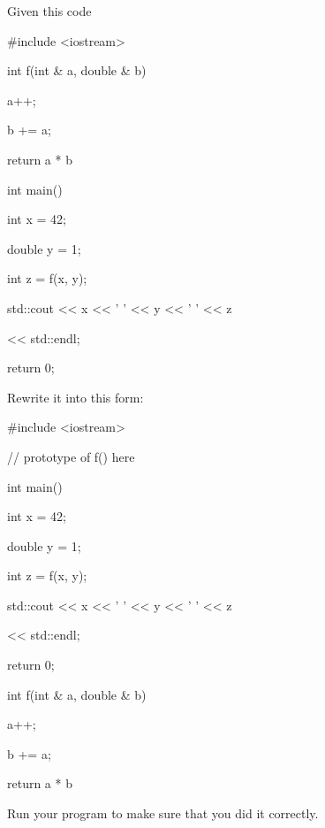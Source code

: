 Given this code



\begin{consolethree}[escapeinside=||]

#include <iostream>



int f(int & a, double & b)

{

    a++;

    b += a;

    return a * b

}



int main()

{

    int x = 42;

    double y = 1;

    int z = f(x, y);

    std::cout << x << ' ' << y << ' ' << z

              << std::endl;

    return 0;

}

\end{consolethree}



Rewrite it into this form:



\begin{consolethree}[escapeinside=||]

#include <iostream>



// prototype of f() here



int main()

{

    int x = 42;

    double y = 1;

    int z = f(x, y);

    std::cout << x << ' ' << y << ' ' << z

              << std::endl;

    return 0;

}



int f(int & a, double & b)

{

    a++;

    b += a;

    return a * b

}

\end{consolethree}



Run your program to make sure that you did it correctly.

